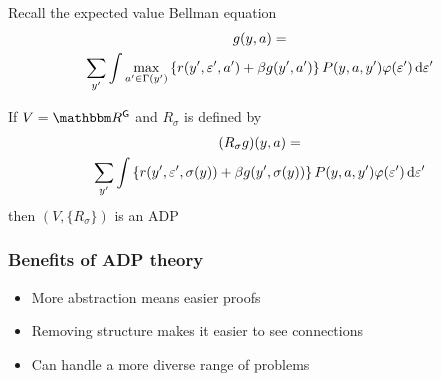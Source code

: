 \documentclass[dvipsnames]{beamer}
\begin{document}
\begin{frame}
    
    Recall the expected value Bellman equation
    \begin{multline*}
        g(y, a)
        = \\
         \sum_{y'} \int
            \max_{a' \in \Gamma(y')}
            \left\{
                r(y', \varepsilon', a')
                + \beta
                g(y', a')
            \right\}
            P(y, a, y') \varphi(\varepsilon') \mathop{}\!\mathrm{d} \varepsilon'
    \end{multline*}

    If $V = \RR^\Gsf$ and $R_\sigma$ is defined by 
    \begin{multline*}
        (R_\sigma g)(y, a)
        = \\
         \sum_{y'} \int
            \left\{
                r(y', \varepsilon', \sigma(y))
                + \beta
                g(y', \sigma(y))
            \right\}
            P(y, a, y') \varphi(\varepsilon') \mathop{}\!\mathrm{d} \varepsilon'
    \end{multline*}
    then $(V, \{R_\sigma\})$ is an ADP

\end{frame}


\begin{frame}
    \frametitle{Benefits of ADP theory}
    

    \begin{itemize}
        \item More abstraction means easier proofs
            \vspace{0.5em}
            \vspace{0.5em}
            \vspace{0.5em}
        \item Removing structure makes it easier to see connections
            \vspace{0.5em}
            \vspace{0.5em}
            \vspace{0.5em}
        \item Can handle a more diverse range of problems
    \end{itemize}


\end{frame}
\end{document}
